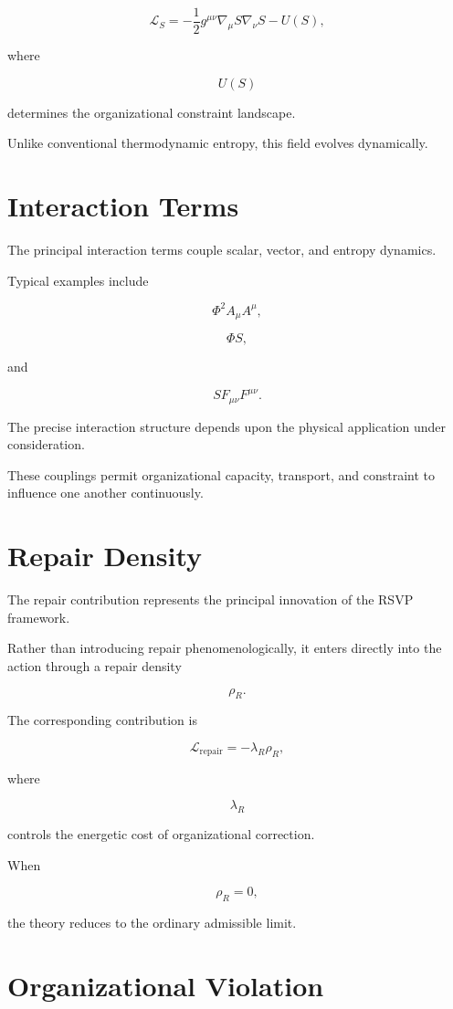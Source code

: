 \documentclass[11pt,oneside]{book}
\numberwithin{equation}{chapter}
\theoremstyle{definition}
\theoremstyle{plain}
\begin{document}
\[
\mathcal L_S
=
-
\frac12
g^{\mu\nu}
\nabla_\mu S
\nabla_\nu S
-
U(S),
\]

where

\[
U(S)
\]

determines the organizational constraint landscape.

Unlike conventional thermodynamic entropy, this field evolves
dynamically.

\section{Interaction Terms}

The principal interaction terms couple scalar, vector, and entropy
dynamics.

Typical examples include

\[
\Phi^2
A_\mu
A^\mu,
\]

\[
\Phi
S,
\]

and

\[
S
F_{\mu\nu}
F^{\mu\nu}.
\]

The precise interaction structure depends upon the physical application
under consideration.

These couplings permit organizational capacity, transport, and constraint
to influence one another continuously.

\section{Repair Density}

The repair contribution represents the principal innovation of the RSVP
framework.

Rather than introducing repair phenomenologically, it enters directly into
the action through a repair density

\[
\rho_R.
\]

The corresponding contribution is

\[
\mathcal L_{\mathrm{repair}}
=
-\lambda_R
\rho_R,
\]

where

\[
\lambda_R
\]

controls the energetic cost of organizational correction.

When

\[
\rho_R
=
0,
\]

the theory reduces to the ordinary admissible limit.

\section{Organizational Violation}
\end{document}
